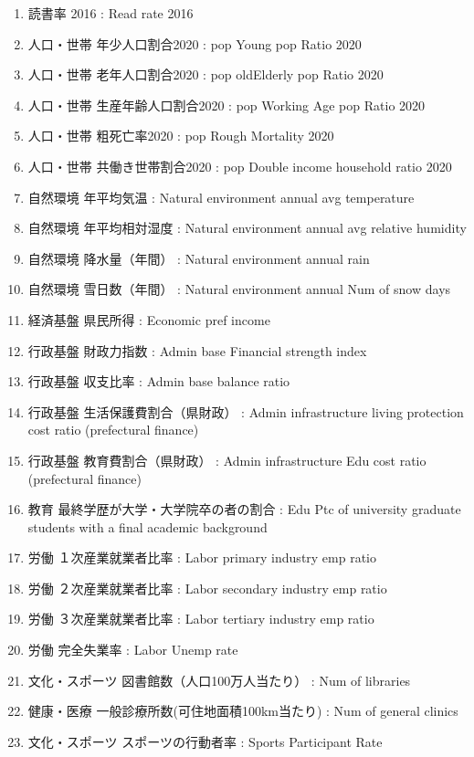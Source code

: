 \begin{enumerate}
  \item 読書率 2016  :  Read rate 2016
  \item 人口・世帯 年少人口割合2020  :  pop Young pop Ratio 2020
  \item 人口・世帯 老年人口割合2020  :  pop oldElderly pop Ratio 2020
  \item 人口・世帯 生産年齢人口割合2020  :  pop Working Age pop Ratio 2020
  \item 人口・世帯 粗死亡率2020  :  pop Rough Mortality 2020
  \item 人口・世帯 共働き世帯割合2020  :  pop Double income household ratio 2020
  \item 自然環境 年平均気温  :  Natural environment annual avg temperature
  \item 自然環境 年平均相対湿度  :  Natural environment annual avg relative humidity
  \item 自然環境 降水量（年間）  :  Natural environment annual rain
  \item 自然環境 雪日数（年間）  :  Natural environment annual Num of snow days
  \item 経済基盤 県民所得  :  Economic pref income
  \item 行政基盤 財政力指数  :  Admin base Financial strength index
  \item 行政基盤 収支比率  :  Admin base balance ratio
  \item 行政基盤 生活保護費割合（県財政）  :  Admin infrastructure living protection cost ratio (prefectural finance)
  \item 行政基盤 教育費割合（県財政）  :  Admin infrastructure Edu cost ratio (prefectural finance)
  \item 教育 最終学歴が大学・大学院卒の者の割合  :  Edu Ptc of university graduate students with a final academic background
  \item 労働 １次産業就業者比率  :  Labor primary industry emp ratio
  \item 労働 ２次産業就業者比率  :  Labor secondary industry emp ratio
  \item 労働 ３次産業就業者比率  :  Labor tertiary industry emp ratio
  \item 労働 完全失業率  :  Labor Unemp rate
  \item 文化・スポーツ 図書館数（人口100万人当たり）  :  Num of libraries
  \item 健康・医療 一般診療所数(可住地面積100km当たり)  :  Num of general clinics
  \item 文化・スポーツ スポーツの行動者率  :  Sports Participant Rate

\end{enumerate}

